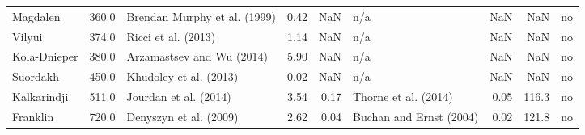 \begin{tabular}{lrlrrlrrl}
            Magdalen &  360.0 &  Brendan Murphy et al. (1999) &               0.42 &               NaN &                                            n/a &               NaN &        NaN &       no \\
              Vilyui &  374.0 &           Ricci et al. (2013) &               1.14 &               NaN &                                            n/a &               NaN &        NaN &       no \\
        Kola-Dnieper &  380.0 &     Arzamastsev and Wu (2014) &               5.90 &               NaN &                                            n/a &               NaN &        NaN &       no \\
            Suordakh &  450.0 &        Khudoley et al. (2013) &               0.02 &               NaN &                                            n/a &               NaN &        NaN &       no \\
         Kalkarindji &  511.0 &         Jourdan et al. (2014) &               3.54 &              0.17 &                           Thorne et al. (2014) &              0.05 &      116.3 &       no \\
            Franklin &  720.0 &        Denyszyn et al. (2009) &               2.62 &              0.04 &                        Buchan and Ernst (2004) &              0.02 &      121.8 &       no \\
\bottomrule
\end{tabular}
